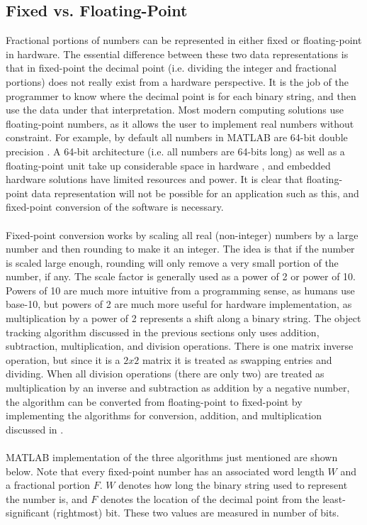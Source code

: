 \documentclass[11pt]{article} %
\begin{document}
\subsection{Fixed vs. Floating-Point}
\label{sec:fp}
Fractional portions of numbers can be represented in either fixed or floating-point in hardware. The essential difference between these two data representations is that in fixed-point the decimal point (i.e. dividing the integer and fractional portions) does not really exist from a hardware perspective. It is the job of the programmer to know where the decimal point is for each binary string, and then use the data under that interpretation. Most modern computing solutions use floating-point numbers, as it allows the user to implement real numbers without constraint. For example, by default all numbers in MATLAB are 64-bit double precision \cite{10}. A 64-bit architecture (i.e. all numbers are 64-bits long) as well as a floating-point unit take up considerable space in hardware \cite{10}, and embedded hardware solutions have limited resources and power. It is clear that floating-point data representation will not be possible for an application such as this, and fixed-point conversion of the software is necessary. \\\\
Fixed-point conversion works by scaling all real (non-integer) numbers by a large number and then rounding to make it an integer. The idea is that if the number is scaled large enough, rounding will only remove a very small portion of the number, if any. The scale factor is generally used as a power of 2 or power of 10. Powers of 10 are much more intuitive from a programming sense, as humans use base-10, but powers of 2 are much more useful for hardware implementation, as multiplication by a power of 2 represents a shift along a binary string. The object tracking algorithm discussed in the previous sections only uses addition, subtraction, multiplication, and division operations. There is one matrix inverse operation, but since it is a $2x2$ matrix it is treated as swapping entries and dividing. When all division operations (there are only two) are treated as multiplication by an inverse and subtraction as addition by a negative number, the algorithm can be converted from floating-point to fixed-point by implementing the algorithms for conversion, addition, and multiplication discussed in \cite{10}. \\\\
MATLAB implementation of the three algorithms just mentioned are shown below. Note that every fixed-point number has an associated word length $W$ and a fractional portion $F$. $W$ denotes how long the binary string used to represent the number is, and $F$ denotes the location of the decimal point from the least-significant (rightmost) bit. These two values are measured in number of bits.\\\\
\end{document}
